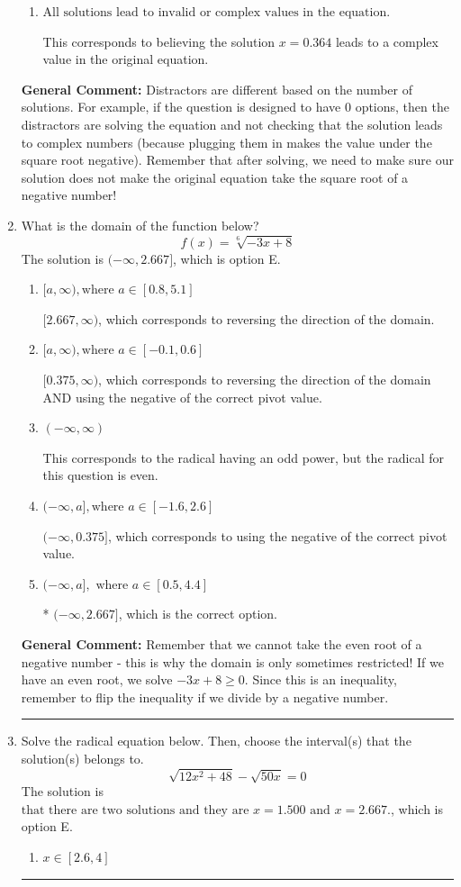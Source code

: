 \documentclass{extbook}[14pt]
\newcommand{\litem}[1]{\item #1

\rule{\textwidth}{0.4pt}}
\begin{document}
\begin{enumerate}
{\begin{enumerate}[label=\Alph*.]
* $x = 0.364$, which is the correct option.
\item \( \text{All solutions lead to invalid or complex values in the equation.} \)

This corresponds to believing the solution $x = 0.364$ leads to a complex value in the original equation.
\end{enumerate}

\textbf{General Comment:} Distractors are different based on the number of solutions. For example, if the question is designed to have 0 options, then the distractors are solving the equation and not checking that the solution leads to complex numbers (because plugging them in makes the value under the square root negative). Remember that after solving, we need to make sure our solution does not make the original equation take the square root of a negative number!
}
\litem{
What is the domain of the function below?
\[ f(x) = \sqrt[6]{-3 x + 8} \]The solution is \( (-\infty, 2.667] \), which is option E.\begin{enumerate}[label=\Alph*.]
\item \( [a, \infty), \text{where } a \in [0.8, 5.1] \)

 $[2.667, \infty)$, which corresponds to reversing the direction of the domain.
\item \( [a, \infty), \text{where } a \in [-0.1, 0.6] \)

$[0.375, \infty)$, which corresponds to reversing the direction of the domain AND using the negative of the correct pivot value.
\item \( (-\infty, \infty) \)

This corresponds to the radical having an odd power, but the radical for this question is even.
\item \( (-\infty, a], \text{where } a \in [-1.6, 2.6] \)

$(-\infty, 0.375]$, which corresponds to using the negative of the correct pivot value.
\item \( (-\infty, a], \text{ where } a \in [0.5, 4.4] \)

* $(-\infty, 2.667]$, which is the correct option.
\end{enumerate}

\textbf{General Comment:} Remember that we cannot take the even root of a negative number - this is why the domain is only sometimes restricted! If we have an even root, we solve $-3 x + 8 \geq 0$. Since this is an inequality, remember to flip the inequality if we divide by a negative number.
}
\litem{
Solve the radical equation below. Then, choose the interval(s) that the solution(s) belongs to.
\[ \sqrt{12 x^2 + 48} - \sqrt{50 x} = 0 \]The solution is \( \text{that there are two solutions and they are } x = 1.500 \text{ and } x = 2.667. \), which is option E.\begin{enumerate}[label=\Alph*.]
\item \( x \in [2.6,4] \)


\end{enumerate}}
\end{enumerate}
\end{document}
